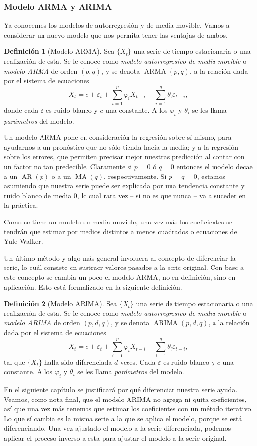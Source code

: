 \documentclass[11pt,letterpaper]{article}
\newcommand{\AR}{\ensuremath{\operatorname{AR}}}
\newcommand{\MA}{\ensuremath{\operatorname{MA}}}
\newcommand{\ARMA}{\ensuremath{\operatorname{ARMA}}}
\newcommand{\ARIMA}{\ensuremath{\operatorname{ARIMA}}}
\theoremstyle{definition}
\newtheorem{definition}{Definición}[section]
\theoremstyle{theorem}
\theoremstyle{remark}
\begin{document}
	\subsubsection{Modelo ARMA y ARIMA}
	\noindent\justify Ya conocemos los modelos de autorregresión y de media movible. Vamos a considerar un nuevo modelo que nos permita tener las ventajas de ambos.
	\begin{definition}[Modelo ARMA]
		Sea \(\{X_t\}\) una serie de tiempo estacionaria o una realización de esta. Se le conoce como \textit{modelo autorregresivo de media movible} o \textit{modelo ARMA} de orden \((p,q)\), y se denota \(\ARMA(p,q)\), a la relación dada por el sistema de ecuaciones
		\[X_t=c+\varepsilon_t+\sum_{i=1}^{p}\varphi_iX_{t-i}+\sum_{i=1}^{q}\theta_i\varepsilon_{t-i},\]
		donde cada \(\varepsilon\) es ruido blanco y \(c\) una constante. A los \(\varphi_i\) y \(\theta_i\) se les llama \textit{parámetros} del modelo.
	\end{definition}
	Un modelo ARMA pone en consideración la regresión sobre sí mismo, para ayudarnos a un pronóstico que no sólo tienda hacia la media; y a la regresión sobre los errores, que permiten precisar mejor nuestras predicción al contar con un factor no tan predecible. Claramente si \(p=0\) ó \(q=0\) entonces el modelo decae a un \(\AR(p)\) o a un \(\MA(q)\), respectivamente. Si \(p=q=0\), estamos asumiendo que nuestra serie puede ser explicada por una tendencia constante y ruido blanco de media 0, lo cual rara vez -- si no es que nunca -- va a suceder en la práctica. \par
	Como se tiene un modelo de media movible, una vez más los coeficientes se tendrán que estimar por medios distintos a menos cuadrados o ecuaciones de Yule-Walker. \par
	Un último método y algo más general involucra al concepto de diferenciar la serie, lo cuál consiste en sustraer valores pasados a la serie original. Con base a este concepto se cambia un poco el modelo ARMA, no en definición, sino en aplicación. Esto está formalizado en la siguiente definición.
	\begin{definition}[Modelo ARIMA]
		Sea \(\{X_t\}\) una serie de tiempo estacionaria o una realización de esta. Se le conoce como \textit{modelo autorregresivo de media movible} o \textit{modelo ARIMA} de orden \((p,d,q)\), y se denota \(\ARIMA(p,d,q)\), a la relación dada por el sistema de ecuaciones
		\[X_t=c+\varepsilon_t+\sum_{i=1}^{p}\varphi_iX_{t-i}+\sum_{i=1}^{q}\theta_i\varepsilon_{t-i},\]
		tal que \(\{X_t\}\) halla sido diferenciada \(d\) veces. Cada \(\varepsilon\) es ruido blanco y \(c\) una constante. A los \(\varphi_i\) y \(\theta_i\) se les llama \textit{parámetros} del modelo. 
	\end{definition} \par
	En el siguiente capítulo se justificará por qué diferenciar nuestra serie ayuda. Veamos, como nota final, que el modelo ARIMA no agrega ni quita coeficientes, así que una vez más tenemos que estimar los coeficientes con un método iterativo. Lo que sí cambia es la misma serie a la que se aplica el modelo, porque se está diferenciando. Una vez ajustado el modelo a la serie diferenciada, podemos aplicar el proceso inverso a esta para ajustar el modelo a la serie original.
\end{document}
